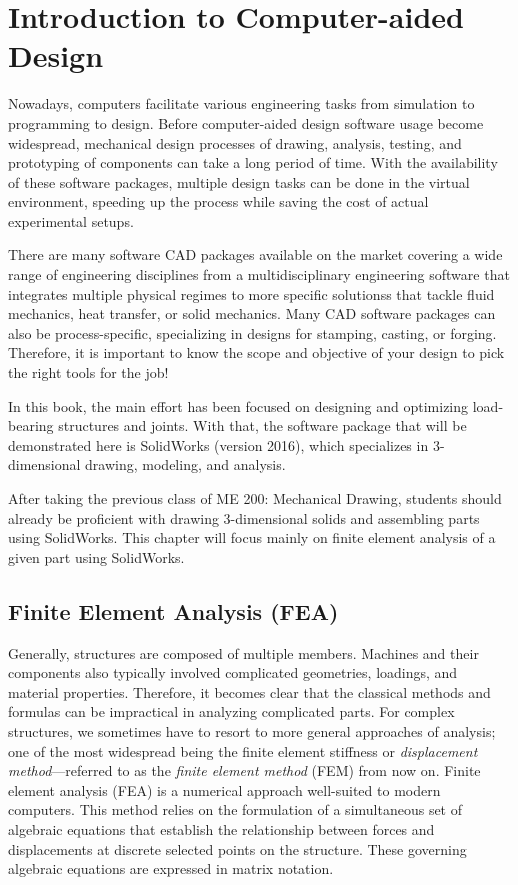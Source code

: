 \documentclass[
10pt,
a4paper,
openany,
svgnames,
]{book}
\begin{document}
\chapter{Introduction to Computer-aided Design}

Nowadays, computers facilitate various engineering tasks from simulation to programming to design. Before computer-aided design software usage become widespread, mechanical design processes of drawing, analysis, testing, and prototyping of components can take a long period of time. With the availability of these software packages, multiple design tasks can be done in the virtual environment, speeding up the process while saving the cost of actual experimental setups.

There are many software CAD packages available on the market covering a wide range of engineering disciplines from a multidisciplinary engineering software that integrates multiple physical regimes to more specific solutionss that tackle fluid mechanics, heat transfer, or solid mechanics. Many CAD software packages can also be process-specific, specializing in designs for stamping, casting, or forging. Therefore, it is important to know the scope and objective of your design to pick the right tools for the job!

In this book, the main effort has been focused on designing and optimizing load-bearing structures and joints. With that, the software package that will be demonstrated here is SolidWorks (version 2016), which specializes in 3-dimensional drawing, modeling, and analysis.

After taking the previous class of ME 200: Mechanical Drawing, students should already be proficient with drawing 3-dimensional solids and assembling parts using SolidWorks. This chapter will focus mainly on finite element analysis of a given part using SolidWorks.

\section{Finite Element Analysis (FEA)}

Generally, structures are composed of multiple members. Machines and their components also typically involved complicated geometries, loadings, and material properties. Therefore, it becomes clear that the classical methods and formulas can be impractical in analyzing complicated parts. For complex structures, we sometimes have to resort to more general approaches of analysis; one of the most widespread being the finite element stiffness or \emph{displacement method}—referred to as the \emph{finite element method} (FEM) from now on. Finite element analysis (FEA) is a numerical approach well-suited to modern computers. This method relies on the formulation of a simultaneous set of algebraic equations that establish the relationship between forces and displacements at discrete selected points on the structure. These governing algebraic equations are expressed in matrix notation.
\end{document}
